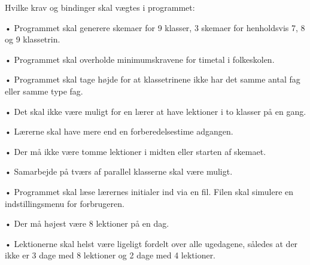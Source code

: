 Hvilke krav og bindinger skal vægtes i programmet:

•	Programmet skal generere skemaer for 9 klasser, 3 skemaer for henholdsvis 7, 8 og 9 klassetrin.

•	Programmet skal overholde minimumskravene for timetal i folkeskolen.

•	Programmet skal tage højde for at klassetrinene ikke har det samme antal fag eller samme type fag.

•	Det skal ikke være muligt for en lærer at have lektioner i to klasser på en gang.

•	Lærerne skal have mere end en forberedelsestime adgangen.

•	Der må ikke være tomme lektioner i midten eller starten af skemaet.

•	Samarbejde på tværs af parallel klasserne skal være muligt. 

•	Programmet skal læse lærernes initialer ind via en fil. Filen skal simulere en indstillingsmenu for forbrugeren.

•	Der må højest være 8 lektioner på en dag.

•	Lektionerne skal helst være ligeligt fordelt over alle ugedagene, således at der ikke er 3 dage med 8 lektioner og 2 dage med 4 lektioner.
